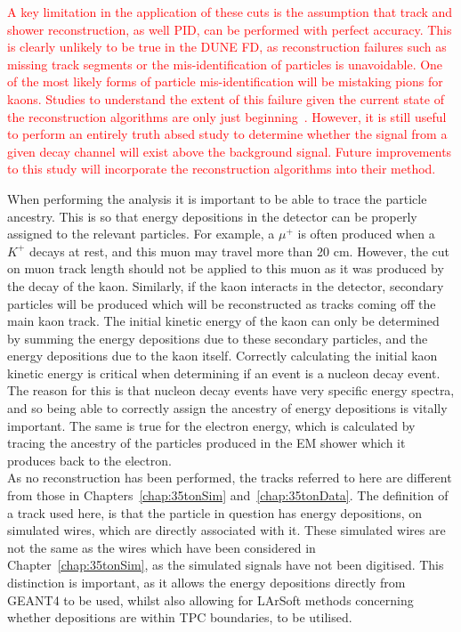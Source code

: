 \textcolor{red}{A key limitation in the application of these cuts is the assumption that track and shower reconstruction, as well PID, can be performed with perfect accuracy. This is clearly unlikely to be true in the DUNE FD, as reconstruction failures such as missing track segments or the mis-identification of particles is unavoidable. One of the most likely forms of particle mis-identification will be mistaking pions for kaons. Studies to understand the extent of this failure given the current state of the reconstruction algorithms are only just beginning~\citep{KevinSeptCollab, AAron_17_02_08, Tingjun_17_02_08, Aaron_17_03_01}. However, it is still useful to perform an entirely truth absed study to determine whether the signal from a given decay channel will exist above the background signal. Future improvements to this study will incorporate the reconstruction algorithms into their method.}    

When performing the analysis it is important to be able to trace the particle ancestry. This is so that energy depositions in the detector can be properly assigned to the relevant particles. For example, a $\mu^{+}$ is often produced when a $K^{+}$ decays at rest, and this muon may travel more than 20 cm. However, the cut on muon track length should not be applied to this muon as it was produced by the decay of the kaon. Similarly, if the kaon interacts in the detector, secondary particles will be produced which will be reconstructed as tracks coming off the main kaon track. The initial kinetic energy of the kaon can only be determined by summing the energy depositions due to these secondary particles, and the energy depositions due to the kaon itself. Correctly calculating the initial kaon kinetic energy is critical when determining if an event is a nucleon decay event. The reason for this is that nucleon decay events have very specific energy spectra, and so being able to correctly assign the ancestry of energy depositions is vitally important. The same is true for the electron energy, which is calculated by tracing the ancestry of the particles produced in the EM shower which it produces back to the electron. \\

As no reconstruction has been performed, the tracks referred to here are different from those in Chapters~\ref{chap:35tonSim} and~\ref{chap:35tonData}. The definition of a track used here, is that the particle in question has energy depositions, on simulated wires, which are directly associated with it. These simulated wires are not the same as the wires which have been considered in Chapter~\ref{chap:35tonSim}, as the simulated signals have not been digitised. This distinction is important, as it allows the energy depositions directly from GEANT4 to be used, whilst also allowing for LArSoft methods concerning whether depositions are within TPC boundaries, to be utilised. \\

